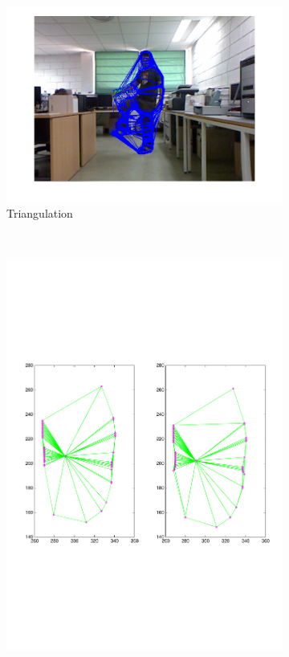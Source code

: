 \begin{figure}[t]
        \centering
        \begin{subfigure}[b]{0.33\textwidth}
                \centering
                \includegraphics[width=\textwidth, trim=0 0 0 0,clip]{fig21.jpg}
                \caption{Triangulation}
                \label{fig:cp02_err_measure_triangulation}
        \end{subfigure}%
        ~ %
        \begin{subfigure}[b]{0.33\textwidth}
                \centering
                \includegraphics[width=\textwidth, trim=40 230 30 220,clip]{fig22.pdf}

\end{subfigure}
\end{figure}
